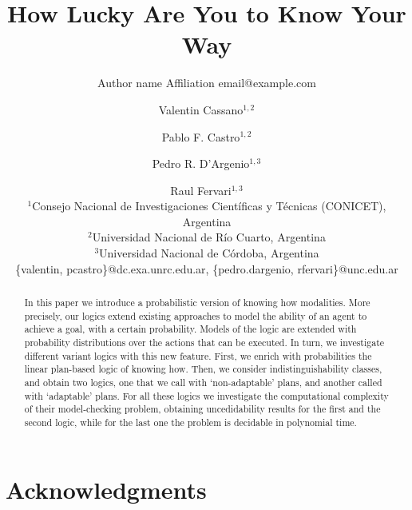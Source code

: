 \documentclass{article}
\title{How Lucky Are You to Know Your Way}
\author{%
    Author name
    \affiliations
    Affiliation
    \emails
    email@example.com    %
}
\author{%
Valentin Cassano$^{1,2}$\and
Pablo F. Castro$^{1,2}$\and
Pedro R. D'Argenio$^{1,3}$\and
Raul Fervari$^{1,3}$ \\
\affiliations
$^1$Consejo Nacional de Investigaciones Cient\'ificas y T\'ecnicas (CONICET), Argentina\\
$^2$Universidad Nacional de R\'io Cuarto, Argentina\\
$^3$Universidad Nacional de C\'ordoba, Argentina\\
\emails
\{valentin, pcastro\}@dc.exa.unrc.edu.ar,
\{pedro.dargenio, rfervari\}@unc.edu.ar
}
\begin{document}
\maketitle

\begin{abstract}
  In this paper we introduce a probabilistic version of knowing how modalities. More precisely, our logics extend existing approaches to model the ability of an agent to achieve a goal, with a certain probability. Models of the logic are extended with probability distributions over the actions that can be executed. In turn, we investigate different variant logics with this new feature. First, we enrich with probabilities the linear plan-based logic of knowing how. Then, we consider indistinguishability classes, and obtain two logics, one that we call with `non-adaptable' plans, and another called with `adaptable' plans. For all these logics we investigate the computational complexity of their model-checking problem, obtaining uncedidability results for the first and the second logic, while for the last one the problem is decidable in polynomial time.
\end{abstract}






\section*{Acknowledgments}



\appendix






\end{document}
